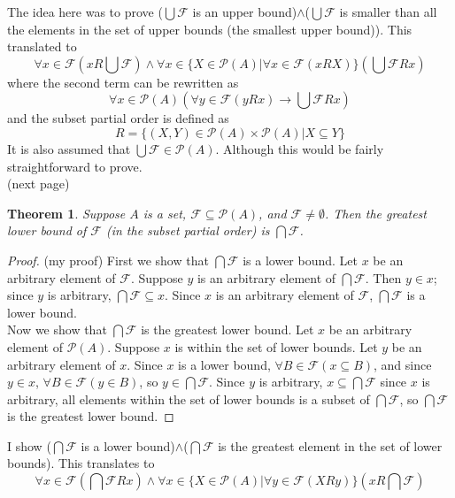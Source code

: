 \documentclass{report}
\newtheorem*{theorem}{Theorem}
\theoremstyle{definition}
\begin{document}
\noindent The idea here was to prove ($\bigcup\mathcal F$ is an upper bound)$\land$($\bigcup\mathcal F$ is smaller than all the elements in the set of upper bounds (the smallest upper bound)). 
This translated to
\begin{equation*}
\forall x\in\mathcal F(xR\bigcup\mathcal F)\land\forall x\in\{X\in\mathscr P(A)|\forall x\in\mathcal F(xRX)\}(\bigcup\mathcal FRx)
\end{equation*}
where the second term can be rewritten as
\begin{equation*}
\forall x\in\mathscr P(A)(\forall y\in\mathcal F(yRx)\to\bigcup\mathcal FRx)
\end{equation*}
and the subset partial order is defined as
\begin{equation*}
R=\{(X,Y)\in\mathscr P(A)\times\mathscr P(A)|X\subseteq Y\}
\end{equation*}
It is also assumed that $\bigcup\mathcal F\in\mathscr P(A)$. Although this would be fairly straightforward to prove.\\
(next page)\newpage
\begin{theorem}
Suppose $A$ is a set, $\mathcal F\subseteq\mathscr P(A)$, and $\mathcal F\neq\emptyset$. Then the
greatest lower bound of $\mathcal F$ (in the subset partial order) is $\bigcap\mathcal F$.
\end{theorem}
\begin{proof}(my proof)
First we show that $\bigcap\mathcal F$ is a lower bound. Let $x$ be an arbitrary element of $\mathcal F$. Suppose $y$ is an arbitrary element of $\bigcap\mathcal F$. Then $y\in x$; since $y$ is
arbitrary, $\bigcap\mathcal F\subseteq x$. Since $x$ is an arbitrary element of $\mathcal F$, $\bigcap\mathcal F$ is a lower bound.\\
\indent Now we show that $\bigcap\mathcal F$ is the greatest lower bound.
Let $x$ be an arbitrary element of $\mathscr P(A)$. Suppose $x$ is within the set of lower bounds. Let $y$ be an arbitrary element of $x$. Since $x$ is a lower bound, 
$\forall B\in\mathcal F(x\subseteq B)$, and since $y\in x$, $\forall B\in\mathcal F(y\in B)$, so $y\in\bigcap\mathcal F$. Since $y$ is arbitrary, $x\subseteq\bigcap\mathcal F$ since $x$ is
arbitrary, all elements within the set of lower bounds is a subset of $\bigcap\mathcal F$, so $\bigcap\mathcal F$ is the greatest lower bound.
\end{proof}
\noindent I show ($\bigcap\mathcal F$ is a lower bound)$\land$($\bigcap\mathcal F$ is the greatest element in the set of lower bounds). This translates to
\begin{equation*}
\forall x\in\mathcal F(\bigcap\mathcal FRx)\land\forall x\in\{X\in\mathscr P(A)|\forall y\in\mathcal F(XRy)\}(xR\bigcap\mathcal F)
\end{equation*}
\end{document}
